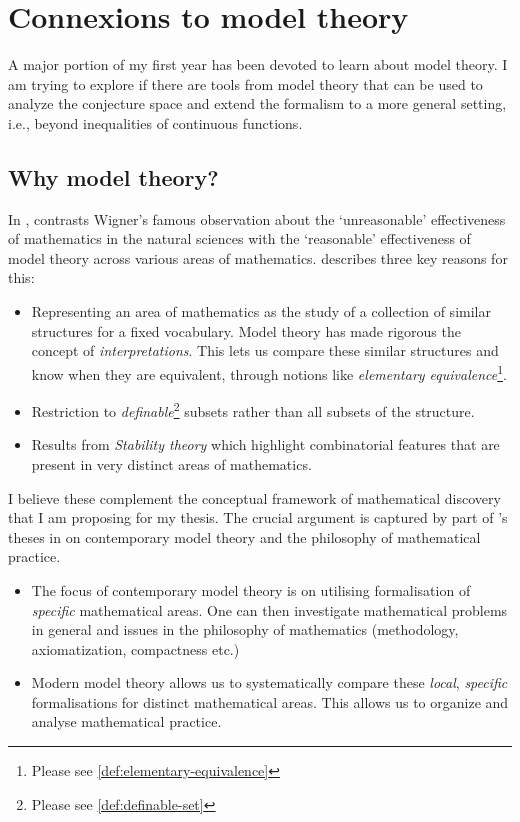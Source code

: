 \section{Connexions to model theory}
A major portion of my first year has been devoted to learn about model theory. I am trying to explore if there are tools from model theory that can be used to analyze the conjecture space and extend the formalism to a more general setting, i.e., beyond inequalities of continuous functions.
\subsection{Why model theory?}
\label{sec:why-model-theory}

In \cite{baldwin2020reasonable}, \citeauthor{baldwin2020reasonable} contrasts Wigner's famous observation \cite{wigner1990unreasonable} about the `unreasonable' effectiveness of mathematics in the natural sciences with the `reasonable' effectiveness of model theory across various areas of mathematics. \citeauthor{baldwin2020reasonable} describes three key reasons for this:
\begin{itemize}
    \item Representing an area of mathematics as the study of a collection of similar structures for a fixed vocabulary. Model theory has made rigorous the concept of \textit{interpretations}. This lets us compare these similar structures and know when they are equivalent, through notions like \textit{elementary equivalence}\footnote[1]{Please see \ref{def:elementary-equivalence}}.
    \item Restriction to \textit{definable}\footnote[2]{Please see \ref{def:definable-set}} subsets rather than all subsets of the structure.
    \item Results from \textit{Stability theory} which highlight combinatorial features that are present in very distinct areas of mathematics. 
\end{itemize} 
I believe these complement the conceptual framework of mathematical discovery that I am proposing for my thesis.
The crucial argument is captured by part of \citeauthor{Baldwin_2018}'s theses in \cite{Baldwin_2018} on contemporary model theory and the philosophy of mathematical practice.
\begin{itemize}
    \item The focus of contemporary model theory is on utilising formalisation of \textit{specific} mathematical areas. One can then investigate mathematical problems in general and issues in the philosophy of mathematics (methodology, axiomatization, compactness etc.)
    \item Modern model theory allows us to systematically compare these \textit{local}, \textit{specific} formalisations for distinct mathematical areas. This allows us to organize and analyse mathematical practice.
\end{itemize}

